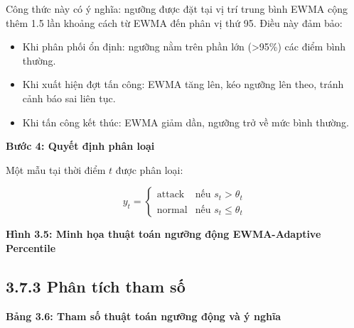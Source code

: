 \documentclass[
  a4paper]{report}
\providecommand{\tightlist}{%
  \setlength{\itemsep}{0pt}\setlength{\parskip}{0pt}}
\begin{document}
Công thức này có ý nghĩa: ngưỡng được đặt tại vị trí trung bình EWMA
cộng thêm 1.5 lần khoảng cách từ EWMA đến phân vị thứ 95. Điều này đảm
bảo:

\begin{itemize}
\tightlist
\item
  Khi phân phối ổn định: ngưỡng nằm trên phần lớn (\textgreater95\%) các
  điểm bình thường.
\item
  Khi xuất hiện đợt tấn công: EWMA tăng lên, kéo ngưỡng lên theo, tránh
  cảnh báo sai liên tục.
\item
  Khi tấn công kết thúc: EWMA giảm dần, ngưỡng trở về mức bình thường.
\end{itemize}

\textbf{Bước 4: Quyết định phân loại}

Một mẫu tại thời điểm \(t\) được phân loại:

\[
y_t = \begin{cases}
\text{attack} & \text{nếu } s_t > \theta_t \\
\text{normal} & \text{nếu } s_t \leq \theta_t
\end{cases}
\]

\textbf{Hình 3.5: Minh họa thuật toán ngưỡng động EWMA-Adaptive
Percentile}

\subsection{3.7.3 Phân tích tham số}\label{phuxe2n-tuxedch-tham-sux1ed1}

\textbf{Bảng 3.6: Tham số thuật toán ngưỡng động và ý nghĩa}
\end{document}
